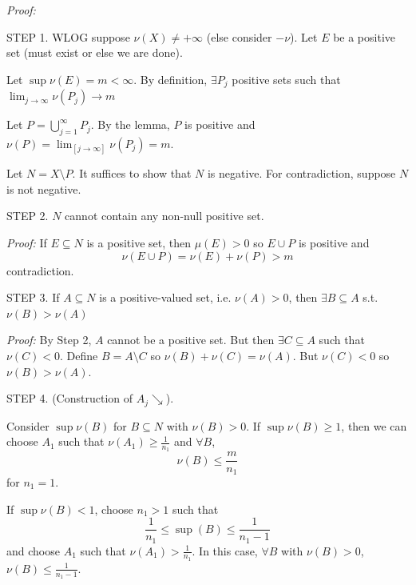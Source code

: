 \documentclass[12pt]{report}
\newcommand{\M}{\mathcal{M}}
\newcommand{\sub}{\subseteq}
\newenvironment*{tbox}[2][gray]{
    \begin{tcolorbox}[
        parbox=false,
        colback=#1!5!white,
        colframe=#1!75!black,
        breakable,
        title={#2}
    ]}
    {\end{tcolorbox}}
\newenvironment*{proof}[1][blue]{
\begin{tcolorbox}[
    parbox=false,
    colback=#1!5!white,
    colframe=#1!75!black,
    breakable
]}
{\end{tcolorbox}}
\begin{document}
        \begin{tbox}{\textbf{Hahn Decomposition Theorem:} If $\nu$ is a signed measure on $(X, \M)$, then there exists a positive set $P$ and a negative set $N$ such that $X = P \cup N$ and $P \cap N = \emptyset$. Further, if $P', N'$ is another pair of sets with this property, then $P \triangle P' = \emptyset$ and $N \triangle N' = \emptyset$.}
            \emph{Proof:} 

            STEP 1. WLOG suppose $\nu(X) \neq +\infty$ (else consider $-\nu$). Let $E$ be a positive set (must exist or else we are done). 

            Let $\sup \nu(E) = m < \infty$. By definition, $\exists P_j$ positive sets such that $\lim_{j \to \infty} \nu(P_j) \to m$
            
            Let $P = \bigcup_{j=1}^\infty P_j$. By the lemma, $P$ is positive and $\nu(P) = \lim_[j \to \infty] \nu(P_j) = m$.

            Let $N = X \setminus P$. It suffices to show that $N$ is negative. For contradiction, suppose $N$ is not negative. 

            STEP 2. $N$ cannot contain any non-null positive set. 

            \begin{proof}
                \emph{Proof:} If $E \sub N$ is a positive set, then $\mu(E) > 0$ so $E \cup P$ is positive and 
                \[\nu(E \cup P) = \nu(E) + \nu(P) > m\]
                contradiction. 
            \end{proof}

            STEP 3. If $A \sub N$ is a positive-valued set, i.e. $\nu(A) > 0$, then $\exists B\sub A$ s.t. $\nu(B) > \nu(A)$

            \begin{proof}
                \emph{Proof:} By Step 2, $A$ cannot be a positive set. But then $\exists C \sub A$ such that $\nu(C) < 0$. Define $B = A \setminus C$ so $\nu(B) + \nu(C) = \nu(A)$. But $\nu(C) < 0$ so $\nu(B) > \nu(A)$.
            \end{proof}

            STEP 4. (Construction of $A_j \searrow$). 
            
            Consider $\sup \nu(B)$ for $B \sub N$ with $\nu(B) > 0$. If $\sup \nu(B) \geq 1$, then we can choose $A_1$ such that $\nu(A_1) \geq \frac{1}{n_1}$ and $\forall B$, 
            \[\nu(B) \leq \frac{m}{n_1}\]
            for $n_1 = 1$. 

            If $\sup \nu(B) <1$, choose $n_1 > 1$ such that 
            \[\frac{1}{n_1} \leq \sup(B) \leq \frac{1}{n_1 - 1}\]
            and choose $A_1$ such that $\nu(A_1) > \frac{1}{n_1}$. In this case, $\forall B$ with $\nu(B) > 0$, $\nu(B) \leq \frac{1}{n_1- 1}$.


\end{tbox}
\end{document}
